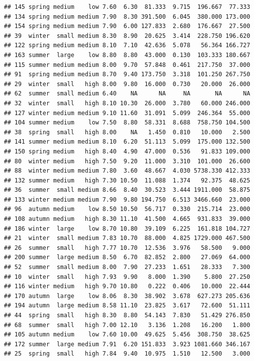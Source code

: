 \documentclass[]{report}
\begin{document}
\begin{verbatim}
## 145 spring medium    low 7.60  6.30  81.333  9.715  196.667  77.333
## 134 spring medium medium 7.90  8.30 391.500  6.045  380.000 173.000
## 154 spring medium medium 7.90  6.00 127.833  2.680  176.667  27.500
## 39  winter  small medium 8.30  8.90  20.625  3.414  228.750 196.620
## 122 spring medium medium 8.10  7.10  42.636  5.078   56.364 166.727
## 163 summer  large    low 8.80  8.80  43.000  0.130  103.333 180.667
## 115 summer medium medium 8.00  9.70  57.848  0.461  217.750  37.000
## 91  spring medium medium 8.70  9.40 173.750  3.318  101.250 267.750
## 29  winter  small   high 8.00  9.80  16.000  0.730   20.000  26.000
## 62  summer  small medium 6.40    NA      NA     NA       NA      NA
## 32  winter  small   high 8.10 10.30  26.000  3.780   60.000 246.000
## 127 winter medium medium 9.10 11.60  31.091  5.099  246.364  55.000
## 104 summer medium    low 7.50  8.80  58.331  8.688  758.750 104.500
## 38  spring  small   high 8.00    NA   1.450  0.810   10.000   2.500
## 141 summer medium medium 8.10  6.20  51.113  5.099  175.000 132.500
## 150 spring medium   high 8.40  4.90  47.000  0.536   91.833 109.000
## 80  winter medium   high 7.50  9.20  11.000  3.310  101.000  26.600
## 88  winter medium medium 7.80  3.60  48.667  4.030 5738.330 412.333
## 132 summer medium   high 7.30 10.50  11.088  1.374   92.375  48.625
## 36  summer  small medium 8.66  8.40  30.523  3.444 1911.000  58.875
## 133 winter medium medium 7.90  9.80 194.750  6.513 3466.660  23.000
## 96  autumn medium    low 8.50 10.50  56.717  0.330  215.714  23.000
## 108 autumn medium   high 8.30 11.10  41.500  4.665  931.833  39.000
## 186 winter  large    low 8.70 10.80  39.109  6.225  161.818 104.727
## 21  winter  small medium 7.83 10.70  88.000  4.825 1729.000 467.500
## 26  summer  small   high 7.77 10.70  12.536  3.976   58.500   9.000
## 200 summer  large medium 8.50  6.70  82.852  2.800   27.069  64.000
## 52  summer  small medium 8.00  7.90  27.233  1.651   28.333   7.300
## 10  winter  small   high 7.93  9.90   8.000  1.390    5.800  27.250
## 116 winter medium   high 9.70 10.80   0.222  0.406   10.000  22.444
## 170 autumn  large    low 8.06  8.30  38.902  3.678  627.273 205.636
## 194 autumn  large medium 8.58 11.10  23.825  3.617   72.600  51.111
## 44  spring  small   high 8.30  8.80  54.143  7.830   51.429 276.850
## 68  summer  small   high 7.00 12.10   3.136  1.208   16.200   1.800
## 105 autumn medium    low 7.60 10.00  49.625  5.456  308.750  38.625
## 172 summer  large medium 7.91  6.20 151.833  3.923 1081.660 346.167
## 25  spring  small   high 7.84  9.40  10.975  1.510   12.500   3.000

\end{verbatim}
\end{document}

